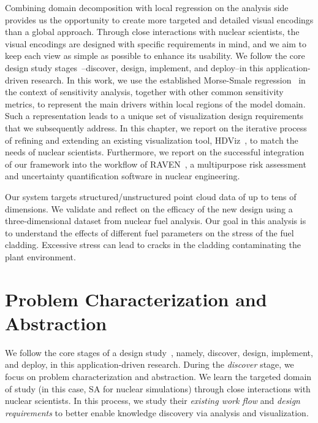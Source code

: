 Combining domain decomposition with local regression on the analysis side provides us the opportunity to create more targeted and detailed visual encodings than a global approach.
%
Through close interactions with nuclear scientists, the visual encodings are designed with specific requirements in mind, and we aim to keep each view as simple as possible to enhance its usability.
%
We follow the core design study stages~\cite{SedlmairMeyerMunzner2012}--discover, design, implement, and deploy--in this application-driven research.
%
In this work, we use the established Morse-Smale regression~\cite{GerberRubelBremer2011} in the context of sensitivity analysis, together with other common sensitivity metrics, to represent the main drivers within local regions of the model domain.
%
Such a representation leads to a unique set of visualization design requirements that we subsequently address.
%
In this chapter, we report on the iterative process of refining and extending an existing visualization tool, HDViz~\cite{GerberBremerPascucci2010}, to match the needs of nuclear scientists.
%
Furthermore, we report on the successful integration of our framework into the workflow of RAVEN~\cite{RabitiAlfonsiCogliati2015}, a multipurpose risk assessment and uncertainty quantification software in nuclear engineering.

Our system targets structured/unstructured point cloud data of up to tens of dimensions.
%
We validate and reflect on the efficacy of the new design using a three-dimensional dataset from nuclear fuel analysis.
%
Our goal in this analysis is to understand the effects of different fuel parameters on the stress of the fuel cladding.
%
Excessive stress can lead to cracks in the cladding contaminating the plant environment.

\section{Problem Characterization and Abstraction}
\label{sec:currentWorkflow}
We follow the core stages of a design study~\cite{SedlmairMeyerMunzner2012}, namely, discover, design, implement, and deploy, in this application-driven research.
%
During the \emph{discover} stage, we focus on problem characterization and abstraction.
%
We learn the targeted domain of study (in this case, SA for nuclear simulations) through close interactions with nuclear scientists.
%
In this process, we study their \emph{existing work flow} and \emph{design requirements} to better enable knowledge discovery via analysis and visualization.

